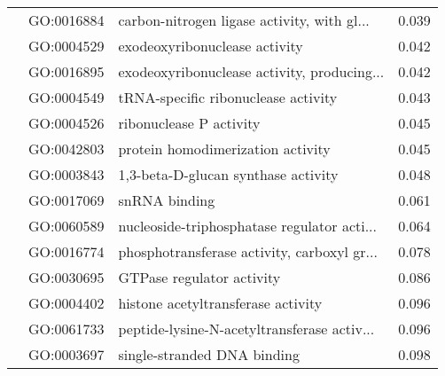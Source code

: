 \begin{longtable}{lllr}
   & GO:0016884 &  carbon-nitrogen ligase activity, with gl... &         0.039 \\
   & GO:0004529 &                exodeoxyribonuclease activity &         0.042 \\
   & GO:0016895 &  exodeoxyribonuclease activity, producing... &         0.042 \\
   & GO:0004549 &          tRNA-specific ribonuclease activity &         0.043 \\
   & GO:0004526 &                      ribonuclease P activity &         0.045 \\
   & GO:0042803 &            protein homodimerization activity &         0.045 \\
   & GO:0003843 &          1,3-beta-D-glucan synthase activity &         0.048 \\
   & GO:0017069 &                                snRNA binding &         0.061 \\
   & GO:0060589 &  nucleoside-triphosphatase regulator acti... &         0.064 \\
   & GO:0016774 &  phosphotransferase activity, carboxyl gr... &         0.078 \\
   & GO:0030695 &                    GTPase regulator activity &         0.086 \\
   & GO:0004402 &           histone acetyltransferase activity &         0.096 \\
   & GO:0061733 &  peptide-lysine-N-acetyltransferase activ... &         0.096 \\
   & GO:0003697 &                  single-stranded DNA binding &         0.098 \\
\end{longtable}
